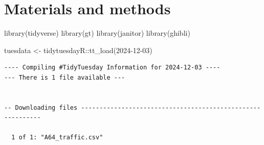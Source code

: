 \documentclass[
  10pt,
  letterpaper,
]{article}
\newenvironment{Shaded}{\begin{snugshade}}{\end{snugshade}}
\newcommand{\FunctionTok}[1]{\textcolor[rgb]{0.28,0.35,0.67}{#1}}
\newcommand{\NormalTok}[1]{\textcolor[rgb]{0.00,0.23,0.31}{#1}}
\newcommand{\OtherTok}[1]{\textcolor[rgb]{0.00,0.23,0.31}{#1}}
\newcommand{\SpecialCharTok}[1]{\textcolor[rgb]{0.37,0.37,0.37}{#1}}
\newcommand{\StringTok}[1]{\textcolor[rgb]{0.13,0.47,0.30}{#1}}
\begin{document}
\section{Materials and methods}\label{materials-and-methods}

\begin{Shaded}
\begin{Highlighting}[]
\FunctionTok{library}\NormalTok{(tidyverse)}
\FunctionTok{library}\NormalTok{(gt)}
\FunctionTok{library}\NormalTok{(janitor)}
\FunctionTok{library}\NormalTok{(ghibli)}
\end{Highlighting}
\end{Shaded}

\begin{Shaded}
\begin{Highlighting}[]
\NormalTok{tuesdata }\OtherTok{\textless{}{-}}\NormalTok{ tidytuesdayR}\SpecialCharTok{::}\FunctionTok{tt\_load}\NormalTok{(}\StringTok{\textquotesingle{}2024{-}12{-}03\textquotesingle{}}\NormalTok{)}
\end{Highlighting}
\end{Shaded}

\begin{verbatim}
---- Compiling #TidyTuesday Information for 2024-12-03 ----
--- There is 1 file available ---


-- Downloading files -----------------------------------------------------------

  1 of 1: "A64_traffic.csv"
\end{verbatim}

\begin{Shaded}
\end{Shaded}
\end{document}
